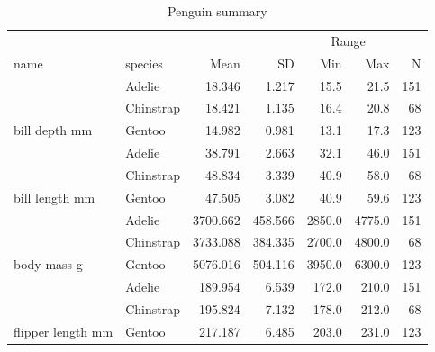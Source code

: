 \documentclass[
  letterpaper,
  DIV=11,
  numbers=noendperiod]{scrartcl}
\begin{document}
\hypertarget{tbl-penguins}{}
\begin{table}
\caption{\label{tbl-penguins}Penguin summary }\tabularnewline

\centering
\begin{tabular}{llrrrrr}
\toprule
\multicolumn{4}{c}{ } & \multicolumn{2}{c}{Range} & \multicolumn{1}{c}{ } \\
\cmidrule(l{3pt}r{3pt}){5-6}
name & species & Mean & SD & Min & Max & N\\
\midrule
 & Adelie & 18.346 & 1.217 & 15.5 & 21.5 & 151\\
\cmidrule{2-7}
 & Chinstrap & 18.421 & 1.135 & 16.4 & 20.8 & 68\\
\cmidrule{2-7}
\multirow{-3}{*}{\raggedright\arraybackslash bill depth mm} & Gentoo & 14.982 & 0.981 & 13.1 & 17.3 & 123\\
\cmidrule{1-7}
 & Adelie & 38.791 & 2.663 & 32.1 & 46.0 & 151\\
\cmidrule{2-7}
 & Chinstrap & 48.834 & 3.339 & 40.9 & 58.0 & 68\\
\cmidrule{2-7}
\multirow{-3}{*}{\raggedright\arraybackslash bill length mm} & Gentoo & 47.505 & 3.082 & 40.9 & 59.6 & 123\\
\cmidrule{1-7}
 & Adelie & 3700.662 & 458.566 & 2850.0 & 4775.0 & 151\\
\cmidrule{2-7}
 & Chinstrap & 3733.088 & 384.335 & 2700.0 & 4800.0 & 68\\
\cmidrule{2-7}
\multirow{-3}{*}{\raggedright\arraybackslash body mass g} & Gentoo & 5076.016 & 504.116 & 3950.0 & 6300.0 & 123\\
\cmidrule{1-7}
 & Adelie & 189.954 & 6.539 & 172.0 & 210.0 & 151\\
\cmidrule{2-7}
 & Chinstrap & 195.824 & 7.132 & 178.0 & 212.0 & 68\\
\cmidrule{2-7}
\multirow{-3}{*}{\raggedright\arraybackslash flipper length mm} & Gentoo & 217.187 & 6.485 & 203.0 & 231.0 & 123\\
\bottomrule
\end{tabular}
\end{table}
\end{document}
